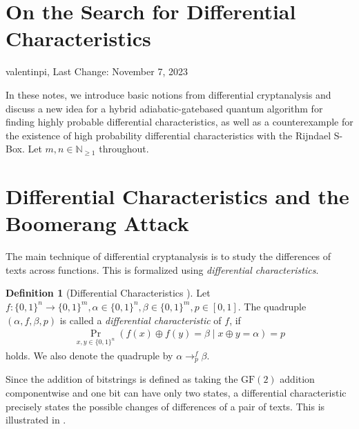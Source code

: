 \documentclass[10pt]{amsart}
\theoremstyle{definition}
\newtheorem{definition}{Definition}
\theoremstyle{remark}
\begin{document}
    \section*{On the Search for Differential Characteristics} \hfill \hfill valentinpi, Last Change: November 7, 2023

    In these notes, we introduce basic notions from differential cryptanalysis and discuss a new idea for a hybrid adiabatic-gatebased quantum algorithm for finding highly probable differential characteristics, as well as a counterexample for the existence of high probability differential characteristics with the Rijndael S-Box. Let \(m, n \in \mathbb{N}_{\geq 1}\) throughout.

    \section{Differential Characteristics and the Boomerang Attack} The main technique of differential cryptanalysis is to study the differences of texts across functions. This is formalized using \emph{differential characteristics}.

    \begin{definition}[{Differential Characteristics \cite[p. 116]{Knudsen}}]
        Let \(f\colon \{0, 1\}^n \to \{0, 1\}^m, \alpha \in \{0, 1\}^n, \beta \in \{0, 1\}^m, p \in [0, 1]\). The quadruple \((\alpha, f, \beta, p)\) is called a \emph{differential characteristic} of \(f\), if
        \begin{align}
            \Pr_{x, y \in \{0, 1\}^n}(f(x) \oplus f(y) = \beta \mid x \oplus y = \alpha) = p
        \end{align}
        holds. We also denote the quadruple by \(\alpha \to_p^f \beta\).
    \end{definition}

    Since the addition of bitstrings is defined as taking the \(\text{GF}(2)\) addition componentwise and one bit can have only two states, a differential characteristic precisely states the possible changes of differences of a pair of texts. This is illustrated in .
\end{document}
